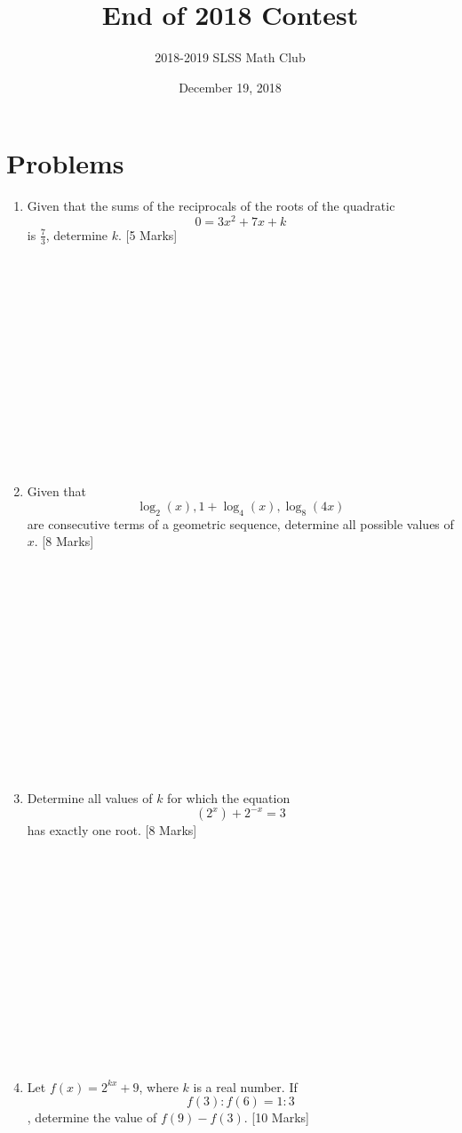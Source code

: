\documentclass[12pt]{article}
\title{End of 2018 Contest\vspace{-3mm}}
\author{2018-2019 SLSS Math Club\vspace{-5mm}}
\date{December 19, 2018\vspace{-5mm}}
\begin{document}
\maketitle

\newcommand{\aSpace}{\\ \\ \\ \\ \\ \\ \\ \\ \\ \\ \\ \\ \\ \\}

\section*{Problems}

\begin{enumerate}
    \item Given that the sums of the reciprocals of the roots of the quadratic $$ 0 = 3x^2 + 7x + k$$ is $\displaystyle{\frac{7}{3}}$, determine $k$. [5 Marks]\aSpace
    
    \item Given that $$\log_2(x), 1 + \log_4(x), \log_8(4x)$$ are consecutive terms of a geometric sequence, determine all possible values of $x$. [8 Marks] \aSpace
    
    \item Determine all values of $k$ for which the equation $$(2^x) + 2^{-x} = 3$$ has exactly one root. [8 Marks]\aSpace
    
    \item Let $f(x) = 2^{kx} + 9$, where $k$ is a real number. If $$f(3):f(6) = 1:3$$, determine the value of $f(9) - f(3)$. [10 Marks]
\end{enumerate}
\end{document}
